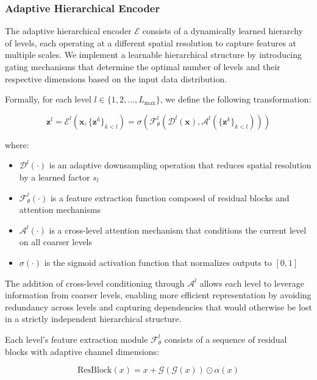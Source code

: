 \documentclass[10pt,twocolumn,letterpaper]{article}
\newcommand{\bm}[1]{\boldsymbol{#1}}
\newcommand{\latent}{\bm{z}}
\newcommand{\encoder}{\mathcal{E}}
\newcommand{\img}{\bm{x}}
\begin{document}
\subsubsection{Adaptive Hierarchical Encoder}
The adaptive hierarchical encoder $\encoder$ consists of a dynamically learned hierarchy of levels, each operating at a different spatial resolution to capture features at multiple scales. We implement a learnable hierarchical structure by introducing gating mechanisms that determine the optimal number of levels and their respective dimensions based on the input data distribution. 

Formally, for each level $l \in \{1,2,...,L_{\text{max}}\}$, we define the following transformation:

\begin{equation}
\latent^l = \mathcal{E}^l(\img, \{\latent^k\}_{k<l}) = \sigma(\mathcal{F}^l_{\theta}(\mathcal{D}^l(\img), \mathcal{A}^l(\{\latent^k\}_{k<l})))
\end{equation}

where:
\begin{itemize}
    \item $\mathcal{D}^l(\cdot)$ is an adaptive downsampling operation that reduces spatial resolution by a learned factor $s_l$
    \item $\mathcal{F}^l_{\theta}(\cdot)$ is a feature extraction function composed of residual blocks and attention mechanisms
    \item $\mathcal{A}^l(\cdot)$ is a cross-level attention mechanism that conditions the current level on all coarser levels
    \item $\sigma(\cdot)$ is the sigmoid activation function that normalizes outputs to $[0,1]$
\end{itemize}

The addition of cross-level conditioning through $\mathcal{A}^l$ allows each level to leverage information from coarser levels, enabling more efficient representation by avoiding redundancy across levels and capturing dependencies that would otherwise be lost in a strictly independent hierarchical structure.

Each level's feature extraction module $\mathcal{F}^l_{\theta}$ consists of a sequence of residual blocks with adaptive channel dimensions:

\begin{equation}
\text{ResBlock}(x) = x + \mathcal{G}(\mathcal{G}(x)) \odot \alpha(x)
\end{equation}
\end{document}
